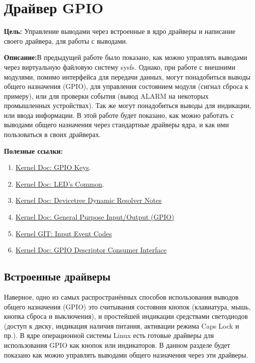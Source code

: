 \chapter{Драйвер GPIO}
\textbf{Цель:} Управление выводами через встроенные в ядро драйверы и написание своего драйвера, для работы с выводами.

\vspace{5mm}
\textbf{Описание:}В предыдущей работе было показано, как можно управлять выводами через виртуальную файловую систему sysfs. Однако, при работе с внешними модулями, помимо интерфейса для передачи данных, могут понадобиться выводы общего назначения (GPIO), для управления состоянием модуля (сигнал сброса к примеру), или для проверки события (вывод ALARM на некоторых промышленных устройствах). Так же могут понадобиться выводы для индикации, или ввода информации. В этой работе будет показано, как можно работать с выводами общего назначения через стандартные драйверы ядра, и как ими пользоваться в своих драйверах. 

\vspace{5mm}
\textbf{Полезные ссылки:}
\begin{enumerate}
	\item \href{https://www.kernel.org/doc/Documentation/devicetree/bindings/input/gpio-keys.txt}{Kernel Doc: GPIO Keys}.
	\item \href{https://www.kernel.org/doc/Documentation/devicetree/bindings/leds/common.yaml}{Kernel Doc: LED's Common}.
	\item \href{https://docs.kernel.org/devicetree/dynamic-resolution-notes.html}{Kernel Doc: Devicetree Dynamic Resolver Notes}
	\item \href{https://www.kernel.org/doc/html/v4.15/driver-api/gpio.html}{Kernel Doc: General Purpose Input/Output (GPIO)}
	\item  \href{https://git.kernel.org/pub/scm/linux/kernel/git/torvalds/linux.git/tree/include/uapi/linux/input-event-codes.h}{Kernel GIT: Input Event Codes} \label{link:event_code}
	\item \href{https://www.kernel.org/doc/Documentation/gpio/consumer.txt}{Kernel Doc: GPIO Descriptor Consumer Interface}	
\end{enumerate}

\section{Встроенные драйверы}
Наверное, одно из самых распространённых способов использования выводов общего назначения (GPIO) это считывания состояния кнопок (клавиатура, мышь, кнопка сброса и выключения), и простейшей индикации средствами светодиодов (доступ к диску,  индикация наличия питания, активации режима Caps Lock и пр.). В ядре операционной системы Linux есть готовые драйверы для использования GPIO как кнопок или индикаторов. В данном разделе будет показано как можно управлять выводами общего назначения через эти драйверы.

